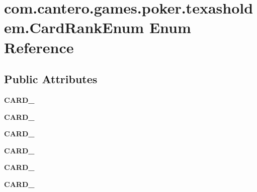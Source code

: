 \hypertarget{enumcom_1_1cantero_1_1games_1_1poker_1_1texasholdem_1_1_card_rank_enum}{}\section{com.\+cantero.\+games.\+poker.\+texasholdem.\+Card\+Rank\+Enum Enum Reference}
\label{enumcom_1_1cantero_1_1games_1_1poker_1_1texasholdem_1_1_card_rank_enum}
\subsection*{Public Attributes}
\begin{DoxyCompactItemize}
\item 
\hypertarget{enumcom_1_1cantero_1_1games_1_1poker_1_1texasholdem_1_1_card_rank_enum_a2f5c320a47c8229edde117a0f6e320ad}{}{\bfseries C\+A\+R\+D\+\_}\label{enumcom_1_1cantero_1_1games_1_1poker_1_1texasholdem_1_1_card_rank_enum_a2f5c320a47c8229edde117a0f6e320ad}

\item 
\hypertarget{enumcom_1_1cantero_1_1games_1_1poker_1_1texasholdem_1_1_card_rank_enum_acc8809b555d5f03a70c6eb191919e812}{}{\bfseries C\+A\+R\+D\+\_}\label{enumcom_1_1cantero_1_1games_1_1poker_1_1texasholdem_1_1_card_rank_enum_acc8809b555d5f03a70c6eb191919e812}

\item 
\hypertarget{enumcom_1_1cantero_1_1games_1_1poker_1_1texasholdem_1_1_card_rank_enum_a3586fc55b4fda2c7ea7d654f37d17199}{}{\bfseries C\+A\+R\+D\+\_}\label{enumcom_1_1cantero_1_1games_1_1poker_1_1texasholdem_1_1_card_rank_enum_a3586fc55b4fda2c7ea7d654f37d17199}

\item 
\hypertarget{enumcom_1_1cantero_1_1games_1_1poker_1_1texasholdem_1_1_card_rank_enum_a94025d002b60f078e77f7fa93cb72b48}{}{\bfseries C\+A\+R\+D\+\_}\label{enumcom_1_1cantero_1_1games_1_1poker_1_1texasholdem_1_1_card_rank_enum_a94025d002b60f078e77f7fa93cb72b48}

\item 
\hypertarget{enumcom_1_1cantero_1_1games_1_1poker_1_1texasholdem_1_1_card_rank_enum_ab0195bb22dafd70aa91d3d29af339dd2}{}{\bfseries C\+A\+R\+D\+\_}\label{enumcom_1_1cantero_1_1games_1_1poker_1_1texasholdem_1_1_card_rank_enum_ab0195bb22dafd70aa91d3d29af339dd2}

\item 
\hypertarget{enumcom_1_1cantero_1_1games_1_1poker_1_1texasholdem_1_1_card_rank_enum_ae6893f2a4f5a885322dea52d107a0202}{}{\bfseries C\+A\+R\+D\+\_}\label{enumcom_1_1cantero_1_1games_1_1poker_1_1texasholdem_1_1_card_rank_enum_ae6893f2a4f5a885322dea52d107a0202}


\end{DoxyCompactItemize}
